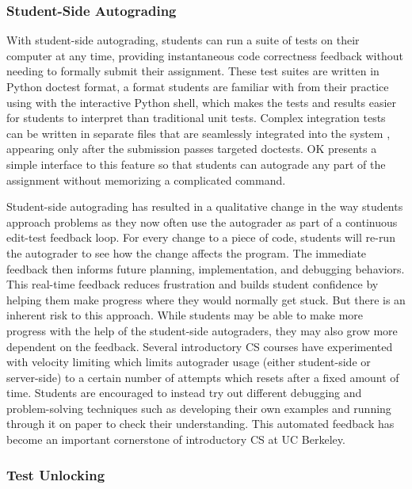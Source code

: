 \subsubsection{Student-Side Autograding}

With student-side autograding, students can run a suite of tests on their computer at any time, providing instantaneous code correctness feedback without needing to formally submit their assignment. These test suites are written in Python doctest format, a format students are familiar with from their practice using with the interactive Python shell, which makes the tests and results easier for students to interpret than traditional unit tests. Complex integration tests can be written in separate files that are seamlessly integrated into the system \cite{Sridhara:2016}, appearing only after the submission passes targeted doctests. OK presents a simple interface to this feature so that students can autograde any part of the assignment without memorizing a complicated command.

Student-side autograding has resulted in a qualitative change in the way students approach problems as they now often use the autograder as part of a continuous edit-test feedback loop. For every change to a piece of code, students will re-run the autograder to see how the change affects the program. The immediate feedback then informs future planning, implementation, and debugging behaviors. This real-time feedback reduces frustration and builds student confidence by helping them make progress where they would normally get stuck. But there is an inherent risk to this approach. While students may be able to make more progress with the help of the student-side autograders, they may also grow more dependent on the feedback. Several introductory CS courses have experimented with velocity limiting which limits autograder usage (either student-side or server-side) to a certain number of attempts which resets after a fixed amount of time. Students are encouraged to instead try out different debugging and problem-solving techniques such as developing their own examples and running through it on paper to check their understanding. This automated feedback has become an important cornerstone of introductory CS at UC Berkeley.

\subsubsection{Test Unlocking}


